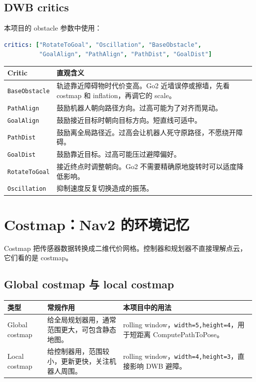 \documentclass[UTF8,11pt,a4paper,openany]{ctexrep}
\newcommand{\code}[1]{\nolinkurl{#1}}
\newcommand{\param}[1]{\nolinkurl{#1}}
\begin{document}
\subsection{DWB critics}

本项目的 obstacle 参数中使用：

\begin{lstlisting}[language=yaml]
critics: ["RotateToGoal", "Oscillation", "BaseObstacle",
          "GoalAlign", "PathAlign", "PathDist", "GoalDist"]
\end{lstlisting}

\begin{longtable}{L{0.22\textwidth}L{0.68\textwidth}}
\toprule
Critic & 直观含义 \\
\midrule
\param{BaseObstacle} & 轨迹靠近障碍物时代价变高。Go2 近墙误停或擦墙，先看 costmap 和 inflation，再调它的 scale。 \\
\param{PathAlign} & 鼓励机器人朝向路径方向。过高可能为了对齐而晃动。 \\
\param{GoalAlign} & 鼓励接近目标时朝向目标方向。短直线可适中。 \\
\param{PathDist} & 鼓励离全局路径近。过高会让机器人死守原路径，不愿绕开障碍。 \\
\param{GoalDist} & 鼓励靠近目标。过高可能压过避障偏好。 \\
\param{RotateToGoal} & 接近终点时调整朝向。Go2 不需要精确原地旋转时可以适度降低影响。 \\
\param{Oscillation} & 抑制速度反复切换造成的振荡。 \\
\bottomrule
\end{longtable}

\section{Costmap：Nav2 的环境记忆}

Costmap 把传感器数据转换成二维代价网格。控制器和规划器不直接理解点云，它们看的是 costmap。

\subsection{Global costmap 与 local costmap}

\begin{longtable}{L{0.22\textwidth}L{0.35\textwidth}L{0.33\textwidth}}
\toprule
类型 & 常规作用 & 本项目中的用法 \\
\midrule
Global costmap & 给全局规划器用，通常范围更大，可包含静态地图。 & rolling window，\code{width=5,height=4}，用于短距离 ComputePathToPose。 \\
Local costmap & 给控制器用，范围较小，更新更快，关注机器人周围。 & rolling window，\code{width=4,height=3}，直接影响 DWB 避障。 \\
\bottomrule
\end{longtable}
\end{document}
